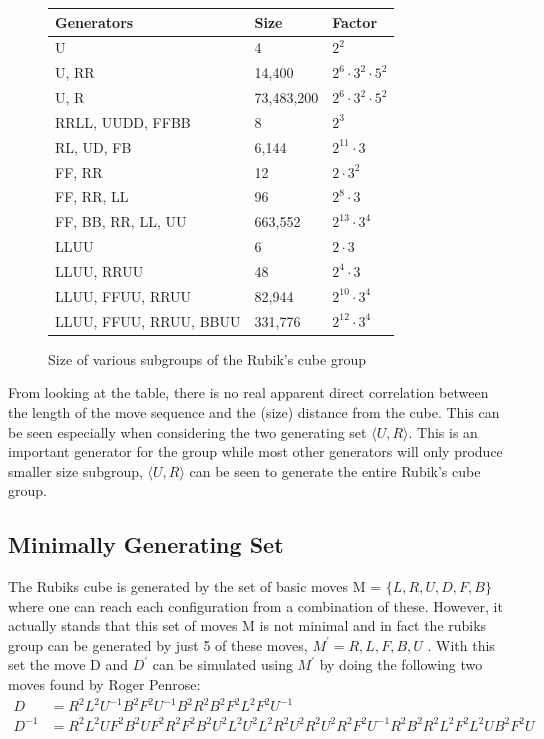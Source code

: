 \documentclass{article}
\begin{document}
\begin{figure}[h]
\begin{center}
    \begin{tabular}{ | p{7cm} | p{2cm} | p{3cm}|}
    \hline
    Generators & Size & Factor \\ \hline
    U & 4 & $2^2$\\ \hline
    U, RR & 14,400 & $2^6 \cdot 3^2 \cdot 5^2$ \\ \hline
    U, R  & 73,483,200 &$2^6 \cdot 3^2 \cdot 5^2$\\ \hline
    RRLL, UUDD, FFBB & 8 & $2^3$ \\ \hline
    RL, UD, FB & 6,144 & $2^11 \cdot 3$\\ \hline
    FF, RR & 12 &$ 2 \cdot 3^2$\\ \hline
    FF, RR, LL & 96 &$ 2^8 \cdot 3$\\ \hline
	FF, BB, RR, LL, UU & 663,552 &$ 2^13 \cdot 3^4$\\ \hline
    LLUU & 6 & $2 \cdot 3$\\ \hline
    LLUU, RRUU & 48 &$ 2^4 \cdot 3 $\\ \hline
    LLUU, FFUU, RRUU & 82,944 &$ 2^{10} \cdot 3^4$\\ \hline
    LLUU, FFUU, RRUU, BBUU & 331,776 &$ 2^{12} \cdot 3^4 $\\ \hline

    \end{tabular}
\end{center}
    \caption{Size of various subgroups of the Rubik's cube group}
    \label{fig:movestable}
\end{figure}
From looking at the table, there is no real apparent direct correlation between the length of the move sequence and the (size) distance from the cube. This can be seen especially when considering the two generating set $\langle U,R\rangle$. This is an important generator for the group while most other generators will only produce smaller size subgroup, $\langle U,R\rangle$ can be seen to generate the entire Rubik's cube group.

\subsection{Minimally Generating Set}

The Rubiks cube is generated by the set of basic moves M = $\{L,R,U,D,F,B\}$ where one can reach each configuration from a combination of these. However, it actually stands that this set of moves M is not minimal and in fact the rubiks group can be generated by just 5 of these moves, $M^{'} = R,L,F,B,U$ \cite{bandelow2012inside}. With this set the move D and $D^{'}$ can be simulated using $M^{'}$ by doing the following two moves found by Roger Penrose:
\begin{align*}
D &= R^{2}L^{2}U^{-1}B^{2}F^{2}U^{-1}B^{2}R^{2}B^{2}F^{2}L^{2}F^{2}U^{-1} \\
D^{-1} &= R^{2}L^{2}UF^{2}B^{2}UF^{2}R^{2}F^{2}B^{2}U^{2}L^{2}U^{2}L^{2}R^{2}U^{2}R^{2}U^{2}R^{2}F^{2}U^{-1}R^{2}B^{2}R^{2}L^{2}F^{2}L^{2}UB^{2}F^{2}U
\end{align*}
\end{document}
